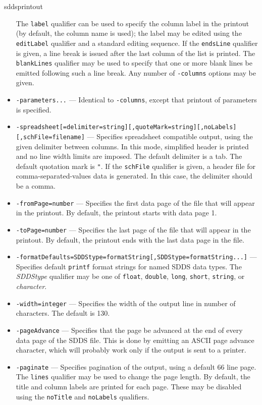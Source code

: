 \begin{sddsprog}{sddsprintout}
\begin{itemize}
        The \verb|label| qualifier can be used to specify the column label in the printout (by default, the column name is used); the label may be edited using the \verb|editLabel| qualifier and a standard editing sequence.
        If the \verb|endsLine| qualifier is given, a line break is issued after the last column of the list is printed. The \verb|blankLines| qualifier may be used to specify that one or more blank lines be emitted following such a line break.
        Any number of \verb|-columns| options may be given.
      \item \verb|-parameters...| --- Identical to \verb|-columns|, except that printout of parameters is specified.
      \item \verb|-spreadsheet[=delimiter=string][,quoteMark=string][,noLabels][,schFile=filename]| --- Specifies spreadsheet compatible output, using the given delimiter between columns. In this mode, simplified header is printed and no line width limits are imposed. The default delimiter is a tab. The default quotation mark is \verb|"|. If the \verb|schFile| qualifier is given, a header file for comma-separated-values data is generated. In this case, the delimiter should be a comma.
      \item \verb|-fromPage=number| --- Specifies the first data page of the file that will appear in the printout. By default, the printout starts with data page 1.
      \item \verb|-toPage=number| --- Specifies the last page of the file that will appear in the printout. By default, the printout ends with the last data page in the file.
      \item \verb|-formatDefaults=SDDStype=formatString[,SDDStype=formatString...]| --- Specifies default \verb|printf| format strings for named SDDS data types. The \emph{SDDStype} qualifier may be one of \verb|float|, \verb|double|, \verb|long|, \verb|short|, \verb|string|, or \emph{character}.
      \item \verb|-width=integer| --- Specifies the width of the output line in number of characters. The default is 130.
      \item \verb|-pageAdvance| --- Specifies that the page be advanced at the end of every data page of the SDDS file. This is done by emitting an ASCII page advance character, which will probably work only if the output is sent to a printer.
      \item \verb|-paginate| --- Specifies pagination of the output, using a default 66 line page. The \verb|lines| qualifier may be used to change the page length. By default, the title and column labels are printed for each page. These may be disabled using the \verb|noTitle| and \verb|noLabels| qualifiers.

\end{itemize}
\end{sddsprog}
